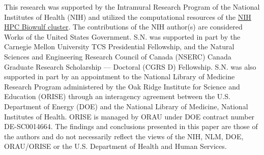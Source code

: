 This research was supported by the Intramural Research Program of the National Institutes of Health (NIH) and utilized the computational resources of the \href{http://hpc.nih.gov}{NIH HPC Biowulf cluster}.
The contributions of the NIH author(s) are considered Works of the United States Government. 
S.N. was supported in part by the Carnegie Mellon University TCS Presidential Fellowship, and the Natural Sciences and Engineering Research Council of Canada (NSERC) Canada Graduate Research Scholarship --- Doctoral (CGRS D) Fellowship.
S.N. was also supported in part by an appointment to the National Library of Medicine Research Program administered by the Oak Ridge Institute for Science and Education (ORISE) through an interagency agreement between the U.S. Department of Energy (DOE) and the National Library of Medicine, National Institutes of Health.
ORISE is managed by ORAU under DOE contract number DE-SC0014664. 
The findings and conclusions presented in this paper are those of the authors and do not necessarily reflect the views of the NIH, NLM, DOE, ORAU/ORISE or the U.S. Department of Health and Human Services. 


